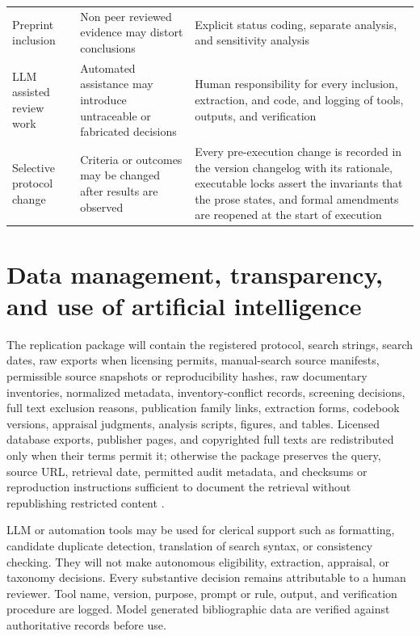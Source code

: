 \begin{longtable}{p{} p{} p{}}
Preprint inclusion & Non peer reviewed evidence may distort conclusions & Explicit status coding, separate analysis, and sensitivity analysis \\
LLM assisted review work & Automated assistance may introduce untraceable or fabricated decisions & Human responsibility for every inclusion, extraction, and code, and logging of tools, outputs, and verification \\
Selective protocol change & Criteria or outcomes may be changed after results are observed & Every pre-execution change is recorded in the version changelog with its rationale, executable locks assert the invariants that the prose states, and formal amendments are reopened at the start of execution \\
\bottomrule
\end{longtable}

\section{Data management, transparency, and use of artificial intelligence}
\label{sec:protocol_data}

The replication package will contain the registered protocol, search strings, search dates, raw exports when licensing permits, manual-search source manifests, permissible source snapshots or reproducibility hashes, raw documentary inventories, normalized metadata, inventory-conflict records, screening decisions, full text exclusion reasons, publication family links, extraction forms, codebook versions, appraisal judgments, analysis scripts, figures, and tables. Licensed database exports, publisher pages, and copyrighted full texts are redistributed only when their terms permit it; otherwise the package preserves the query, source URL, retrieval date, permitted audit metadata, and checksums or reproduction instructions sufficient to document the retrieval without republishing restricted content \cite{Rethlefsen2021PRISMAS}.

LLM or automation tools may be used for clerical support such as formatting, candidate duplicate detection, translation of search syntax, or consistency checking. They will not make autonomous eligibility, extraction, appraisal, or taxonomy decisions. Every substantive decision remains attributable to a human reviewer. Tool name, version, purpose, prompt or rule, output, and verification procedure are logged. Model generated bibliographic data are verified against authoritative records before use.

